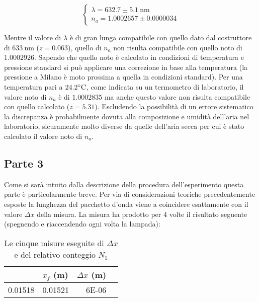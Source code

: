 \documentclass[a4paper,11pt]{article}
\begin{document}
	\begin{equation}
		\begin{cases}
			\lambda = 632.7 \pm 5.1 \ \text{nm} \\ n_a = \num{1.0002657} \pm \num{0.0000034}
		\end{cases}
	\end{equation}

	Mentre il valore di $\lambda$ è di gran lunga compatibile con quello dato dal costruttore di $633 \ \text{nm}$ ($z = 0.063$), quello di $n _a$ non risulta compatibile con quello noto di $1.0002926$.
	Sapendo che quello noto è calcolato in condizioni di temperatura e pressione standard si può applicare una correzione in base alla temperatura (la pressione a Milano è moto prossima a quella in condizioni standard).
	Per una temperatura pari a $24.2 \celsius$, come indicata su un termometro di laboratorio, il valore noto di $n _a$ è di $1.0002835$ ma anche questo valore non risulta compatibile con quello calcolato ($z = 5.31$).
	Escludendo la possibilità di un errore sistematico la discrepanza è probabilmente dovuta alla composizione e umidità dell'aria nel laboratorio, sicuramente molto diverse da quelle dell'aria secca per cui è stato calcolato il valore noto di $n _a$.
	
	\subsection{Parte 3}
	Come si sarà intuito dalla descrizione della procedura dell'esperimento questa parte è particolarmente breve. Per via di considerazioni teoriche precedentemente esposte la lunghezza del pacchetto d'onda viene a coincidere esattamente con il valore $\Delta x$ della misura. La misura ha prodotto per 4 volte il risultato seguente (spegnendo e riaccendendo ogni volta la lampada):
	
	\begin{table}[htbp]
  \centering
  \caption{Le cinque misure eseguite di $\Delta x$ e del relativo conteggio $N _1$}
    \begin{tabular}{rrrr}
    \bottomrule
    \rowcolor[rgb]{ .267,  .447,  .769} \multicolumn{1}{l}{\textcolor[rgb]{ 1,  1,  1}{\textbf{$x _i$ (m)}}} & \multicolumn{1}{l}{\textcolor[rgb]{ 1,  1,  1}{\textbf{$x _f$ (m)}}} & \multicolumn{1}{l}{\textcolor[rgb]{ 1,  1,  1}{\textbf{$\Delta x$ (m)}}} \\
    \toprule
    0.01518 & 0.01521 & 6E-06 \\
    \end{tabular}%
\end{table}%
\end{document}
